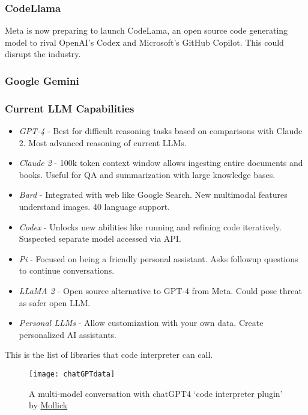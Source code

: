 \subsubsection{CodeLlama}
Meta is now preparing to launch CodeLama, an open source code generating model to rival OpenAI's Codex and Microsoft's GitHub Copilot. This could disrupt the industry.
\subsubsection{Google Gemini}

\subsubsection{Current LLM Capabilities}

\begin{itemize}
\item \textit{GPT-4} - Best for difficult reasoning tasks based on comparisons with Claude 2. Most advanced reasoning of current LLMs.

\item \textit{Claude 2} - 100k token context window allows ingesting entire documents and books. Useful for QA and summarization with large knowledge bases.

\item \textit{Bard} - Integrated with web like Google Search. New multimodal features understand images. 40 language support.

\item \textit{Codex} - Unlocks new abilities like running and refining code iteratively. Suspected separate model accessed via API.

\item \textit{Pi} - Focused on being a friendly personal assistant. Asks followup questions to continue conversations.

\item \textit{LLaMA 2} - Open source alternative to GPT-4 from Meta. Could pose threat as safer open LLM.

\item \textit{Personal LLMs} - Allow customization with your own data. Create personalized AI assistants.
\end{itemize}

This is the list of libraries that code interpreter can call.




\begin{figure}
  \centering
    \texttt{[image: chatGPTdata]}
  \caption{A multi-model conversation with chatGPT4 `code interpreter plugin' by \href{https://www.oneusefulthing.org/p/it-is-starting-to-get-strange}{Mollick}}
  \label{fig:chatGPTdata}
\end{figure}


